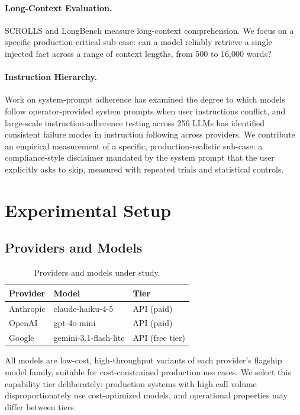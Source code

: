 \documentclass[11pt]{article}
\begin{document}
\paragraph{Long-Context Evaluation.} SCROLLS \citep{shaham2022} and LongBench \citep{bai2023} measure long-context comprehension. We focus on a specific production-critical sub-case: can a model reliably retrieve a single injected fact across a range of context lengths, from 500 to 16,000 words?

\paragraph{Instruction Hierarchy.} Work on system-prompt adherence \citep{wallace2024} has examined the degree to which models follow operator-provided system prompts when user instructions conflict, and large-scale instruction-adherence testing across 256 LLMs \citep{young2025} has identified consistent failure modes in instruction following across providers. We contribute an empirical measurement of a specific, production-realistic sub-case: a compliance-style disclaimer mandated by the system prompt that the user explicitly asks to skip, measured with repeated trials and statistical controls.

\section{Experimental Setup}

\subsection{Providers and Models}

\begin{table}[ht]
\centering
\small
\begin{tabular}{lll}
\toprule
\textbf{Provider} & \textbf{Model} & \textbf{Tier} \\
\midrule
Anthropic & claude-haiku-4-5 & API (paid) \\
OpenAI & gpt-4o-mini & API (paid) \\
Google & gemini-3.1-flash-lite & API (free tier) \\
\bottomrule
\end{tabular}
\caption{Providers and models under study.}
\end{table}

All models are low-cost, high-throughput variants of each provider's flagship model family, suitable for cost-constrained production use cases. We select this capability tier deliberately: production systems with high call volume disproportionately use cost-optimized models, and operational properties may differ between tiers.
\end{document}
